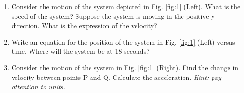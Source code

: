 \documentclass{article}
\begin{document}
\begin{enumerate}
\item Consider the motion of the system depicted in Fig. \ref{fig:1} (Left).  What is the speed of the system?  Suppose the system is moving in the positive y-direction.  What is the expression of the velocity? \\ \vspace{1cm}
\item Write an equation for the position of the system in Fig. \ref{fig:1} (Left) versus time.  Where will the system be at 18 seconds? \\ \vspace{1cm}
\item Consider the motion of the system in Fig. \ref{fig:1} (Right).  Find the change in velocity between points P and Q.  Calculate the acceleration.  \textit{Hint: pay attention to units.}
\end{enumerate}
\end{document}
